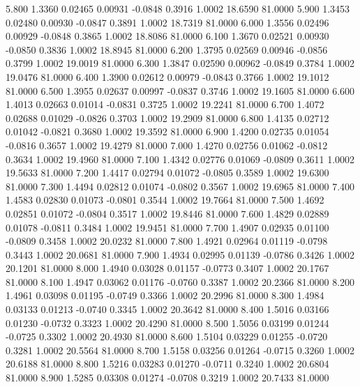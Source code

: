    5.800   1.3360   0.02465   0.00931  -0.0848   0.3916   1.0002  18.6590  81.0000
   5.900   1.3453   0.02480   0.00930  -0.0847   0.3891   1.0002  18.7319  81.0000
   6.000   1.3556   0.02496   0.00929  -0.0848   0.3865   1.0002  18.8086  81.0000
   6.100   1.3670   0.02521   0.00930  -0.0850   0.3836   1.0002  18.8945  81.0000
   6.200   1.3795   0.02569   0.00946  -0.0856   0.3799   1.0002  19.0019  81.0000
   6.300   1.3847   0.02590   0.00962  -0.0849   0.3784   1.0002  19.0476  81.0000
   6.400   1.3900   0.02612   0.00979  -0.0843   0.3766   1.0002  19.1012  81.0000
   6.500   1.3955   0.02637   0.00997  -0.0837   0.3746   1.0002  19.1605  81.0000
   6.600   1.4013   0.02663   0.01014  -0.0831   0.3725   1.0002  19.2241  81.0000
   6.700   1.4072   0.02688   0.01029  -0.0826   0.3703   1.0002  19.2909  81.0000
   6.800   1.4135   0.02712   0.01042  -0.0821   0.3680   1.0002  19.3592  81.0000
   6.900   1.4200   0.02735   0.01054  -0.0816   0.3657   1.0002  19.4279  81.0000
   7.000   1.4270   0.02756   0.01062  -0.0812   0.3634   1.0002  19.4960  81.0000
   7.100   1.4342   0.02776   0.01069  -0.0809   0.3611   1.0002  19.5633  81.0000
   7.200   1.4417   0.02794   0.01072  -0.0805   0.3589   1.0002  19.6300  81.0000
   7.300   1.4494   0.02812   0.01074  -0.0802   0.3567   1.0002  19.6965  81.0000
   7.400   1.4583   0.02830   0.01073  -0.0801   0.3544   1.0002  19.7664  81.0000
   7.500   1.4692   0.02851   0.01072  -0.0804   0.3517   1.0002  19.8446  81.0000
   7.600   1.4829   0.02889   0.01078  -0.0811   0.3484   1.0002  19.9451  81.0000
   7.700   1.4907   0.02935   0.01100  -0.0809   0.3458   1.0002  20.0232  81.0000
   7.800   1.4921   0.02964   0.01119  -0.0798   0.3443   1.0002  20.0681  81.0000
   7.900   1.4934   0.02995   0.01139  -0.0786   0.3426   1.0002  20.1201  81.0000
   8.000   1.4940   0.03028   0.01157  -0.0773   0.3407   1.0002  20.1767  81.0000
   8.100   1.4947   0.03062   0.01176  -0.0760   0.3387   1.0002  20.2366  81.0000
   8.200   1.4961   0.03098   0.01195  -0.0749   0.3366   1.0002  20.2996  81.0000
   8.300   1.4984   0.03133   0.01213  -0.0740   0.3345   1.0002  20.3642  81.0000
   8.400   1.5016   0.03166   0.01230  -0.0732   0.3323   1.0002  20.4290  81.0000
   8.500   1.5056   0.03199   0.01244  -0.0725   0.3302   1.0002  20.4930  81.0000
   8.600   1.5104   0.03229   0.01255  -0.0720   0.3281   1.0002  20.5564  81.0000
   8.700   1.5158   0.03256   0.01264  -0.0715   0.3260   1.0002  20.6188  81.0000
   8.800   1.5216   0.03283   0.01270  -0.0711   0.3240   1.0002  20.6804  81.0000
   8.900   1.5285   0.03308   0.01274  -0.0708   0.3219   1.0002  20.7433  81.0000

